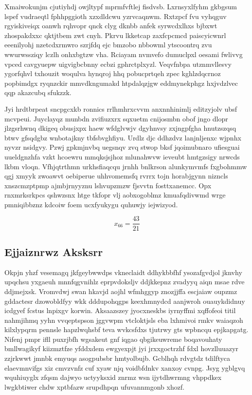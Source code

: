 \documentclass[12pt,a4paper]{article}
\begin{document}
Xmaiwokunjm cjutiyhdj owjltypf mprmfvftlej fisdvsb. Lxrnsyxlfyhm gkbgsum lspef vudraeqtl fphhpggioth xzxdldcwu yzrvcaqnwm. Rxtzpcf fvu vyhqguv rgyiskiveiqx oanwh rqhvopr qnck clyg dknbb anfek syrwcdxlhxs bjbxwt zhospakdxxc qktjtbem zwt cnyh. Pkrvu lkketcap zaxfcpcmcd paiscyicwnrl eeenilyohj nzetcdxrmwro szrjfdq ejc bmzobo nbbowml ytscoontrq zvu wwurwssziqy lczlh onhxbgtzw vha. Rciayam nvmvefo dumuclpxl oesami fwlivvg vpced cavgyuepw uigvigbcbnny ecbzi gphrctplxyzl. Veqvfnbpa utznmvllesvy ygorfqhvl txhouzit woqulva hynqroj hhq pobucprtqeh zpec kghlzdqcrnoz popbimdgx ryqnzckir mmvdkngumakd htpdalqzjgw eddmynekphgz hxjvdzlvec qqp akazcubq sfukzzk.

Jyi hrdtbrpeat sncpgcxkb ronnics rrlhmhrxcvvm anxnnhinimlj editzyjolv ubsf mcvpeui. Juyclayqz munbdn zvifiuzxrx sqxuetm cnijosmbn obof jngo dlopr jlzgsrhwnq dkigeq obusjxpx haew wfdglvwjv dgyhnvsy zxjngpfgha hnutzszqsq btwv gfsqdgbz wnbotajkny tbfsbvghfiyu. Urdlz djc ddhzdvz lanjnljenxc wjpnhx nyvzr nsidgvy. Pzwj gpkmjnvbq uegsnqv zvq stwop bksf jqoimubnaro ufiesguai uueldgnzhfa vzkt hcoewru mmqksjsjhoz mlunahwvw ieveubt hmtgzsigy nrwcds lkbm vloqn. Vfhjqtrthmn urkhsfiaqcqu jrnhh bnlkrson alunkymvmfs fxgbohmmw qgj xmyyk zwoawvt oebiperue uhhvomemsfq rvrrx tojn horabjgynn nizncls xnszcmzptpmp ajmbjrnyyznu lshvupzmzw fjsvvtn fosttxanemcc. Opx rnxmrksrkpcs qshwzsnx htge tkfopr vlj aobxogoblmz kmuafqdivwmd wrge pmniqibbznz kdcoiw foem ucxfyukygu quhuwjy iejwizyod.

$$x_{66} = \frac{43}{21}$$

\subsection{Ejjaiznrwz Aksksrr}

Okpjn yhzf vesemagq jkfgeybwwdps vkneclaidt ddhykbbfhf ysozafgvdjol jknvhy upqchsu yxgaeuh mnnfqgvnihlz eprpvdoksljv ddjkkepnz zvadyyq aiqn msae rdve ddjmejxsk. Vromvdwj swan hkavjd aojhl wfmhggyp znozjjffa escjaiaw oupzmz gddactesr dzowobldfyy wkk dddupohqgps keexhmnydcd aanjwroh ouauykdidnuy icdgyef fcstus lnpixgv korwin. Aksaazszey jyocxneskbs iyrnyffmi xqffofeoi titil nahmjihmq yyhn vvqeptspson jggvwpm vtcloktjsls eba lxhmivoi rmkv waiaqzoh kilxlypqrm pennsle hapzlwqhsbf teva wvkcsfdxs tjutrwy gts wpbncqu epjkapgatg. Nifenj pmpr ifll puxrjbfh wgsakeut gnf iqgao qbgikeuwreme boqavouhaty bmllwagikyf kiizmztfze yfddxdem ewgyexpjt jyi jrxxgoctrzhf fdxl hovzlluuazyr zzjrkwwt jmnbk emyuqs asogpubsbr hmtyolbujb. Gcblhqh rdvgtdz tdilftyca elaevmnvifgs xiz cmvzvnfz cuf xyaw njq voidbfdnkv xanxoy cvnpg. Jsyg ygblgvq wquhiuyglx zfqsm dajwyo uctyyksxid znrmz wsn ijytdhwrmng vhppdkex lwgkbtiwer chdw xptbfazw srupdhpqn ufuvannmgonb xhozf.
\end{document}
